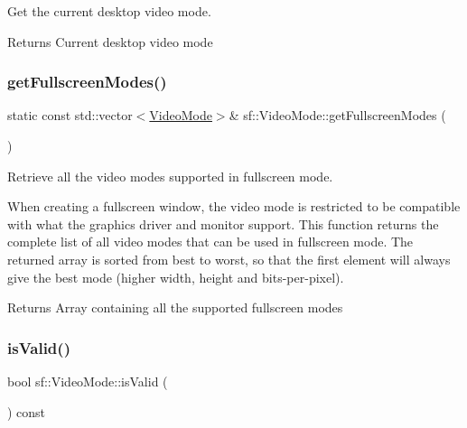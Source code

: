 Get the current desktop video mode. 

\begin{DoxyReturn}{Returns}
Current desktop video mode \begin{DoxyVerb}\end{DoxyVerb}
 
\end{DoxyReturn}
\mbox{\label{classsf_1_1_video_mode_a6815b9b3b35767d5b4563fbed4bfc67b}} 
\subsubsection{\texorpdfstring{getFullscreenModes()}{getFullscreenModes()}}
{\footnotesize\ttfamily static const std\+::vector$<$\mbox{\hyperlink{classsf_1_1_video_mode}{Video\+Mode}}$>$\& sf\+::\+Video\+Mode\+::get\+Fullscreen\+Modes (\begin{DoxyParamCaption}{ }\end{DoxyParamCaption})\hspace{0.3cm}{\ttfamily [static]}}



Retrieve all the video modes supported in fullscreen mode. 

When creating a fullscreen window, the video mode is restricted to be compatible with what the graphics driver and monitor support. This function returns the complete list of all video modes that can be used in fullscreen mode. The returned array is sorted from best to worst, so that the first element will always give the best mode (higher width, height and bits-\/per-\/pixel).

\begin{DoxyReturn}{Returns}
Array containing all the supported fullscreen modes \begin{DoxyVerb}\end{DoxyVerb}
 
\end{DoxyReturn}
\mbox{\label{classsf_1_1_video_mode_ad5e04c044b0925523c75ecb173d2129a}} 
\subsubsection{\texorpdfstring{isValid()}{isValid()}}
{\footnotesize\ttfamily bool sf\+::\+Video\+Mode\+::is\+Valid (\begin{DoxyParamCaption}{ }\end{DoxyParamCaption}) const}



